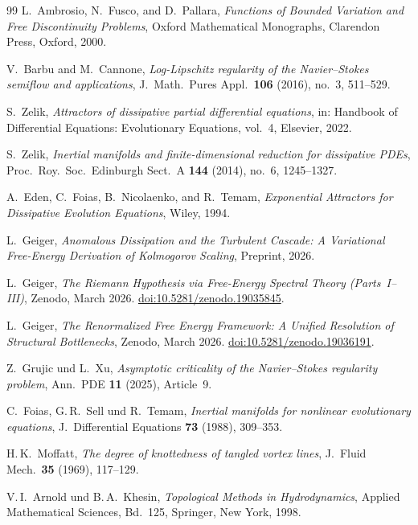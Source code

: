 \documentclass[12pt,a4paper]{article}
\theoremstyle{definition}
\theoremstyle{plain}
\theoremstyle{remark}
\begin{document}
\begin{thebibliography}{99}
L.~Ambrosio, N.~Fusco, and D.~Pallara,
\emph{Functions of Bounded Variation and Free Discontinuity Problems},
Oxford Mathematical Monographs, Clarendon Press, Oxford, 2000.

V.~Barbu and M.~Cannone,
\emph{Log-Lipschitz regularity of the Navier--Stokes semiflow and applications},
J.~Math.\ Pures Appl.\ \textbf{106} (2016), no.~3, 511--529.

S.~Zelik,
\emph{Attractors of dissipative partial differential equations},
in: Handbook of Differential Equations: Evolutionary Equations, vol.~4, Elsevier, 2022.

S.~Zelik,
\emph{Inertial manifolds and finite-dimensional reduction for
dissipative PDEs},
Proc.\ Roy.\ Soc.\ Edinburgh Sect.~A \textbf{144} (2014), no.~6,
1245--1327.

A.~Eden, C.~Foias, B.~Nicolaenko, and R.~Temam,
\emph{Exponential Attractors for Dissipative Evolution Equations},
Wiley, 1994.

L.~Geiger, \emph{Anomalous Dissipation and the Turbulent Cascade:
A Variational Free-Energy Derivation of Kolmogorov Scaling},
Preprint, 2026.

L.~Geiger, \emph{The Riemann Hypothesis via Free-Energy Spectral Theory (Parts~I--III)},
Zenodo, March 2026.
\href{https://doi.org/10.5281/zenodo.19035845}{doi:10.5281/zenodo.19035845}.

L.~Geiger, \emph{The Renormalized Free Energy Framework: A Unified Resolution of Structural Bottlenecks},
Zenodo, March 2026.
\href{https://doi.org/10.5281/zenodo.19036191}{doi:10.5281/zenodo.19036191}.

Z.~Grujic und L.~Xu,
\emph{Asymptotic criticality of the Navier--Stokes regularity problem},
Ann.\ PDE \textbf{11} (2025), Article~9.

C.~Foias, G.\,R.~Sell und R.~Temam,
\emph{Inertial manifolds for nonlinear evolutionary equations},
J.~Differential Equations \textbf{73} (1988), 309--353.

H.\,K.~Moffatt,
\emph{The degree of knottedness of tangled vortex lines},
J.~Fluid Mech.\ \textbf{35} (1969), 117--129.

V.\,I.~Arnold und B.\,A.~Khesin,
\emph{Topological Methods in Hydrodynamics},
Applied Mathematical Sciences, Bd.~125,
Springer, New York, 1998.


\end{thebibliography}
\end{document}
